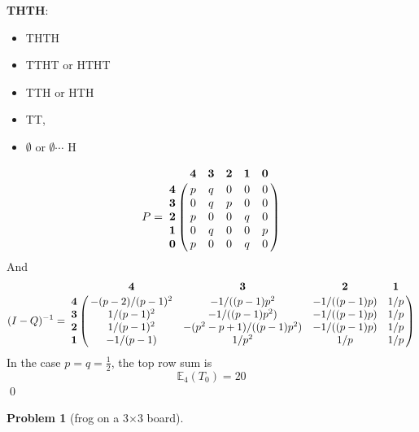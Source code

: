 \documentclass[8pt,notitlepage,twocolumn]{report}
\newtheorem{problem}{Problem}
\newenvironment{solution}[1][Solution]{\begin{trivlist}
    \item[\hskip \labelsep {\bfseries #1}]}{\end{trivlist}}
\begin{document}
\begin{solution}
{\bf THTH}:
\begin{itemize}
	\item[\quad state 0:] {THTH}
 	\item[state 1:] {TTHT or HTHT}
	\item[state 2:] {TTH or HTH}
	\item[state 3:] {TT,}
	\item[state 4:] {$\emptyset$ or $\emptyset\cdots$ H}
\end{itemize}
\begin{equation}
P = 
\bordermatrix{
		&\mathbf{4} 	& \mathbf{3} 	& \mathbf{2} 	& \mathbf{1} 	& \mathbf{0} 	\cr
\mathbf{4} 	& 	p 	& 	q 	& 	0 	& 	0 	& 0 		\cr
\mathbf{3} & 0 & q & p & 0 & 0		\cr
\mathbf{2} & p & 0 & 0 & q & 0		\cr
\mathbf{1} & 0 & q & 0 & 0 & p		\cr
\mathbf{0} & p & 0 & 0 & q & 0
}
\end{equation}
And
\tiny
\begin{equation}
(I-Q)^{-1} = 
\bordermatrix{
&\mathbf{4} 	& \mathbf{3} 	& \mathbf{2} 	& \mathbf{1} 	\cr
\mathbf{4} & -(p-2)/(p-1)^2 & -1/((p-1) p^2 & -1/((p-1)p) & 1/p 	\cr
\mathbf{3} & 1/(p-1)^2 	& -1/((p-1)p^2) & -1/((p-1)p) & 1/p		\cr
\mathbf{2} & 1/(p-1)^2	& -(p^2-p+1)/((p-1)p^2) & -1/((p-1)p) & 1/p	\cr
\mathbf{1} & -1/(p-1)	& 1/p^2		& 1/p	&1/p			
}
\end{equation}
\normalsize
In the case $p=q=\frac{1}{2}$, the top row sum is
$$
	\mathbb{E}_4(T_0) = 20
$$
\qed
\end{solution}

\begin{problem}[frog on a 3$\times$3 board]
\end{problem}
\end{document}
